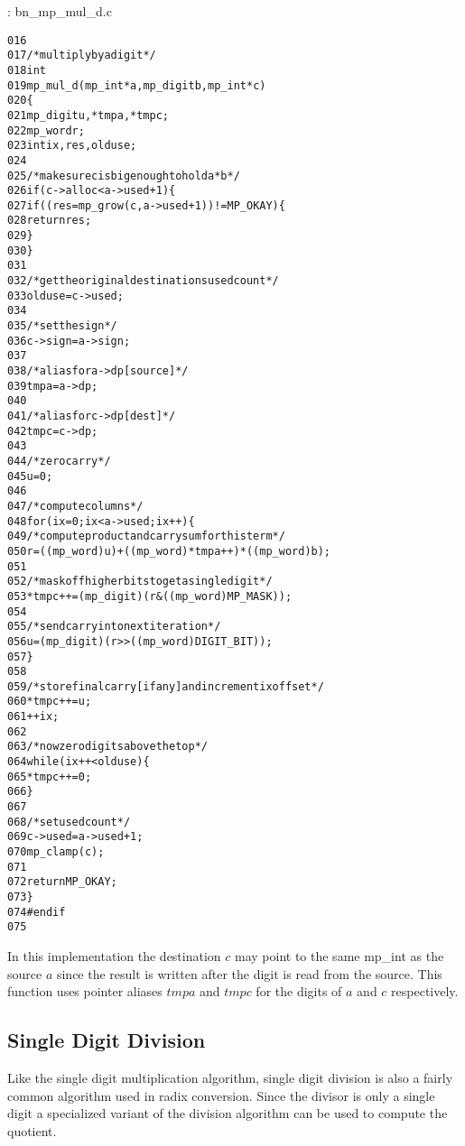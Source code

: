 \documentclass[b5paper]{book}
\begin{document}
\vspace{+3mm}\begin{small}
\hspace{-5.1mm}{\bf File}: bn\_mp\_mul\_d.c
\vspace{-3mm}
\begin{alltt}
016   
017   /* multiply by a digit */
018   int
019   mp_mul_d (mp_int * a, mp_digit b, mp_int * c)
020   \{
021     mp_digit u, *tmpa, *tmpc;
022     mp_word  r;
023     int      ix, res, olduse;
024   
025     /* make sure c is big enough to hold a*b */
026     if (c->alloc < a->used + 1) \{
027       if ((res = mp_grow (c, a->used + 1)) != MP_OKAY) \{
028         return res;
029       \}
030     \}
031   
032     /* get the original destinations used count */
033     olduse = c->used;
034   
035     /* set the sign */
036     c->sign = a->sign;
037   
038     /* alias for a->dp [source] */
039     tmpa = a->dp;
040   
041     /* alias for c->dp [dest] */
042     tmpc = c->dp;
043   
044     /* zero carry */
045     u = 0;
046   
047     /* compute columns */
048     for (ix = 0; ix < a->used; ix++) \{
049       /* compute product and carry sum for this term */
050       r       = ((mp_word) u) + ((mp_word)*tmpa++) * ((mp_word)b);
051   
052       /* mask off higher bits to get a single digit */
053       *tmpc++ = (mp_digit) (r & ((mp_word) MP_MASK));
054   
055       /* send carry into next iteration */
056       u       = (mp_digit) (r >> ((mp_word) DIGIT_BIT));
057     \}
058   
059     /* store final carry [if any] and increment ix offset  */
060     *tmpc++ = u;
061     ++ix;
062   
063     /* now zero digits above the top */
064     while (ix++ < olduse) \{
065        *tmpc++ = 0;
066     \}
067   
068     /* set used count */
069     c->used = a->used + 1;
070     mp_clamp(c);
071   
072     return MP_OKAY;
073   \}
074   #endif
075   
\end{alltt}
\end{small}

In this implementation the destination $c$ may point to the same mp\_int as the source $a$ since the result is written after the digit is 
read from the source.  This function uses pointer aliases $tmpa$ and $tmpc$ for the digits of $a$ and $c$ respectively.  

\subsection{Single Digit Division}
Like the single digit multiplication algorithm, single digit division is also a fairly common algorithm used in radix conversion.  Since the
divisor is only a single digit a specialized variant of the division algorithm can be used to compute the quotient.  
\end{document}
